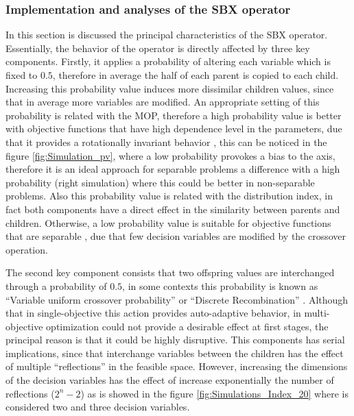 \subsubsection{Implementation and analyses of the SBX operator}

In this section is discussed the principal characteristics of the SBX operator.
%
Essentially, the behavior of the operator is directly affected by three key components.
%
Firstly, it applies a probability of altering each variable which is fixed to $0.5$, therefore in average the half of each parent is copied to each child.
%
Increasing this probability value induces more dissimilar children values, since that in average more variables are modified.
%
An appropriate setting of this probability is related with the MOP, therefore a high probability value is better with objective functions that have high dependence level in the parameters, due that it provides a rotationally invariant behavior \cite{price2006differential}, this can be noticed in the figure \ref{fig:Simulation_pv}, where a low probability provokes a bias to the axis, therefore it is an ideal approach for separable problems a difference with a high probability (right simulation) where this could be better in non-separable problems.
%
Also this probability value is related with the distribution index, in fact both components have a direct effect in the similarity between parents and children.
%
Otherwise, a low probability value is suitable for objective functions that are separable \cite{ma2016multiobjective}, due that few decision variables are modified by the crossover operation.
%

The second key component consists that two offspring values are interchanged through a probability of $0.5$, in some contexts this probability is known as ``Variable uniform crossover probability'' \cite{tuvsar2007differential} or ``Discrete Recombination'' \cite{muhlenbein1993predictive}.
%
Although that in single-objective this action provides auto-adaptive behavior, in multi-objective optimization could not provide a desirable effect at first stages, the principal reason is that it could be highly disruptive.
%
This components has serial implications, since that interchange variables between the children has the effect of multiple ``reflections'' in the feasible space.
%
However, increasing the dimensions of the decision variables has the effect of increase exponentially the number of reflections ($2^{n}-2$) as is showed in the figure \ref{fig:Simulations_Index_20} where is considered two and three decision variables.
%


